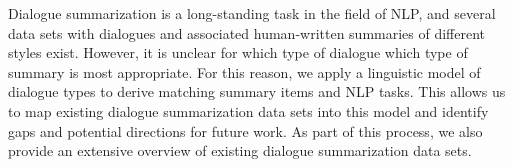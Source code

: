 Dialogue summarization is a long-standing task in the field of NLP, and several data sets with dialogues and associated human-written summaries of different styles exist. However, it is unclear for which type of dialogue which type of summary is most appropriate. For this reason, we apply a linguistic model of dialogue types to derive matching summary items and NLP tasks. This allows us to map existing dialogue summarization data sets into this model and identify gaps and potential directions for future work. As part of this process, we also provide an extensive overview of existing dialogue summarization data sets.
